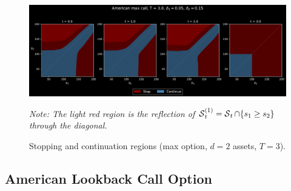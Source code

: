 
\begin{figure}[H]
    \centering
    \caption{Stopping and continuation regions (max option, $d=2$ assets, $T=3$).}
    \includegraphics[scale = 0.42]{Figures/Asym2 Max Call, d = 2, N = 9 (4 dates).pdf}
    \label{fig:asymCall}
    
    \scriptsize{
\textit{Note: The light red region is the reflection of $\operatorname{\mathcal{S}}_t^{(1)} = \operatorname{\mathcal{S}}_t \cap \{s_1 \ge s_2\}$ through the diagonal. %
}} %
\end{figure}


\subsection{American Lookback Call Option} \label{sec:Lkbk}


